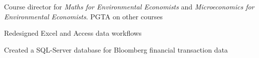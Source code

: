 \documentclass[a4paper,nomath]{deedy-resume} %
\begin{document}
\begin{minipage}[t]{0.66\textwidth}
\begin{tightitemize}
    \end{tightitemize}
    
    \sectionspace %
    

    \begin{tightitemize}
        \item Course director for \textit{Maths for Environmental Economists} and \textit{Microeconomics for Environmental Economists}.
              PGTA on other courses
    \end{tightitemize}

    \sectionspace %



    \begin{tightitemize}
        \item Redesigned Excel and Access data workflows
    \end{tightitemize}

    \sectionspace %



    \begin{tightitemize}
        \item Created a SQL-Server database for Bloomberg financial transaction data
    \end{tightitemize}

    \sectionspace %

  
    
%
%
%
%    
%
%


\end{minipage}
\end{document}
